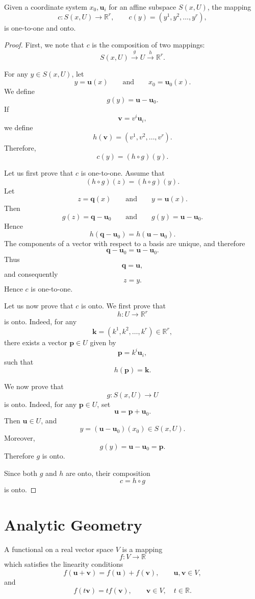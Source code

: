 \documentclass[12pt]{article}
\begin{document}
\begin{proposition}
Given a coordinate system \(x_0,\mathbf{u}_i\) for an affine subspace
\(S(x,U)\), the mapping
\[
c:S(x,U)\longrightarrow\mathbb{R}^r,
\qquad
c(y)=\left(y^1,y^2,\ldots,y^r\right),
\]
is one-to-one and onto.
\end{proposition}

\begin{proof}
First, we note that \(c\) is the composition of two mappings:
\[
S(x,U)\xrightarrow{\,g\,}U\xrightarrow{\,h\,}\mathbb{R}^r.
\]

For any \(y\in S(x,U)\), let
\[
y=\mathbf{u}(x)
\qquad\text{and}\qquad
x_0=\mathbf{u}_0(x).
\]
We define
\[
g(y)=\mathbf{u}-\mathbf{u}_0.
\]
If
\[
\mathbf{v}=v^i\mathbf{u}_i,
\]
we define
\[
h(\mathbf{v})=\left(v^1,v^2,\ldots,v^r\right).
\]
Therefore,
\[
c(y)=(h\circ g)(y).
\]

Let us first prove that \(c\) is one-to-one. Assume that
\[
(h\circ g)(z)=(h\circ g)(y).
\]
Let
\[
z=\mathbf{q}(x)
\qquad\text{and}\qquad
y=\mathbf{u}(x).
\]
Then
\[
g(z)=\mathbf{q}-\mathbf{u}_0
\qquad\text{and}\qquad
g(y)=\mathbf{u}-\mathbf{u}_0.
\]
Hence
\[
h(\mathbf{q}-\mathbf{u}_0)
=
h(\mathbf{u}-\mathbf{u}_0).
\]
The components of a vector with respect to a basis are unique, and therefore
\[
\mathbf{q}-\mathbf{u}_0
=
\mathbf{u}-\mathbf{u}_0.
\]
Thus
\[
\mathbf{q}=\mathbf{u},
\]
and consequently
\[
z=y.
\]
Hence \(c\) is one-to-one.

Let us now prove that \(c\) is onto. We first prove that
\[
h:U\longrightarrow\mathbb{R}^r
\]
is onto. Indeed, for any
\[
\mathbf{k}=\left(k^1,k^2,\ldots,k^r\right)\in\mathbb{R}^r,
\]
there exists a vector \(\mathbf{p}\in U\) given by
\[
\mathbf{p}=k^i\mathbf{u}_i,
\]
such that
\[
h(\mathbf{p})=\mathbf{k}.
\]

We now prove that
\[
g:S(x,U)\longrightarrow U
\]
is onto. Indeed, for any \(\mathbf{p}\in U\), set
\[
\mathbf{u}=\mathbf{p}+\mathbf{u}_0.
\]
Then \(\mathbf{u}\in U\), and
\[
y=(\mathbf{u}-\mathbf{u}_0)(x_0)\in S(x,U).
\]
Moreover,
\[
g(y)=\mathbf{u}-\mathbf{u}_0=\mathbf{p}.
\]
Therefore \(g\) is onto.

Since both \(g\) and \(h\) are onto, their composition
\[
c=h\circ g
\]
is onto.
\end{proof}

\section{Analytic Geometry}

A functional on a real vector space \(V\) is a mapping
\[
f:V\longrightarrow\mathbb{R}
\]
which satisfies the linearity conditions
\[
f(\mathbf{u}+\mathbf{v})
=
f(\mathbf{u})+f(\mathbf{v}),
\qquad
\mathbf{u},\mathbf{v}\in V,
\]
and
\[
f(t\mathbf{v})
=
t f(\mathbf{v}),
\qquad
\mathbf{v}\in V,\quad t\in\mathbb{R}.
\]
\end{document}
